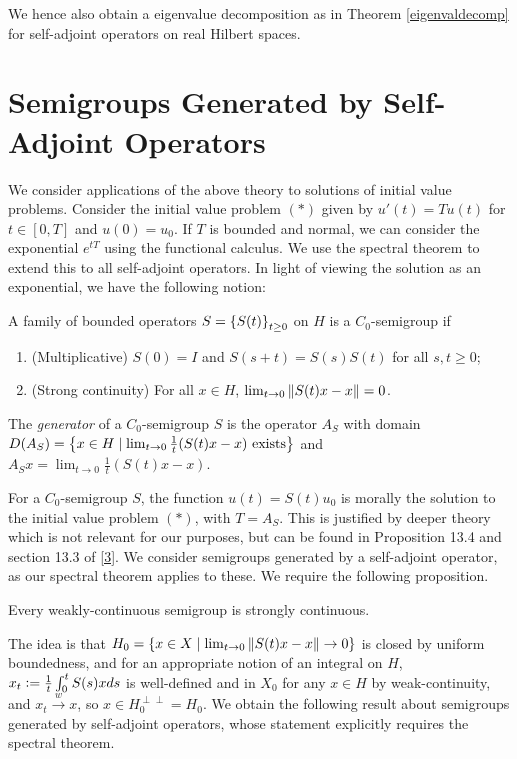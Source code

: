 \documentclass[10pt]{amsart}
\begin{document}
We hence also obtain a eigenvalue decomposition as in Theorem \ref{eigenvaldecomp} for self-adjoint operators on real Hilbert spaces.


\section{Semigroups Generated by Self-Adjoint Operators}
We consider applications of the above theory to solutions of initial value problems. Consider the initial value problem $(*)$ given by $u'(t) = Tu(t)$ for $t \in [0, T]$ and $u(0) = u_0$. If $T$ is bounded and normal, we can consider the exponential $e^{tT}$ using the functional calculus. We use the spectral theorem to extend this to all self-adjoint operators. In light of viewing the solution as an exponential, we have the following notion:
\begin{definition}
    A family of bounded operators $S = \left\{  S(t)  \right\}_{t \geq 0}$ on $H$ is a $C_0$-semigroup if
    \begin{enumerate}
        \item (Multiplicative) $S(0) = I$ and $S(s + t) = S(s)S(t)$ for all $s, t \geq 0$;
        \item (Strong continuity) For all $x \in H$, $\lim_{t \to 0}\left\| S(t)x - x \right\| = 0$.
    \end{enumerate} 
    The \emph{generator} of a $C_0$-semigroup $S$ is the operator $A_S$ with domain $D(A_S) = \left\{  x \in H \mid \lim_{t \to 0}\frac1t(S(t)x - x) \text{ exists}  \right\}$ and $A_Sx = \lim_{t \to 0}\frac1t(S(t)x - x)$.
\end{definition}
For a $C_0$-semigroup $S$, the function $u(t) = S(t)u_0$ is morally the solution to the initial value problem $(*)$, with $T = A_S$. This is justified by deeper theory which is not relevant for our purposes, but can be found in Proposition 13.4 and section 13.3 of \hyperlink{jvn}{[3]}. We consider semigroups generated by a self-adjoint operator, as our spectral theorem applies to these. We require the following proposition.
\begin{proposition}
    Every weakly-continuous semigroup is strongly continuous.
\end{proposition}
The idea is that $H_0 = \left\{  x \in X \mid \lim_{t \to 0} \left\| S(t)x - x \right\| \to 0  \right\}$ is closed by uniform boundedness, and for an appropriate notion of an integral on $H$, $x_t \vcentcolon= \frac1t\int_0^tS(s)xds$ is well-defined and in $X_0$ for any $x \in H$ by weak-continuity, and $x_t \xrightarrow{w} x$, so $x \in H_0^{\perp\perp} = H_0$. We obtain the following result about semigroups generated by self-adjoint operators, whose statement explicitly requires the spectral theorem.
\end{document}
